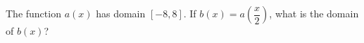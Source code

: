 The function $a(x)$ has domain $[-8,8]$. If $b(x)=a\left(\dfrac {x}{2}\right)$, what is the domain of $b(x)$?
